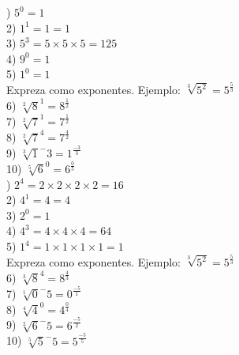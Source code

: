 \documentclass[a4paper,12pt]{article}
\begin{document}
 ) $5^0= 1$ \vspace{1cm}\\ 
2) $1^1= 1=1$ \vspace{1cm}\\ 
3) $5^3=5\times 5\times  5=125$ \vspace{1cm}\\ 
4) $9^0= 1$ \vspace{1cm}\\ 
5) $1^0= 1$ \vspace{1cm}\\ 
 Expreza como exponentes.
 Ejemplo: $\sqrt[3]{5^2}=5^\frac{5}{3} $  \vspace{0.5cm}\\ 
6) $\sqrt[2]{8}^1=8^\frac{1}{2 }$\vspace{1cm}\\ 
7) $\sqrt[2]{7}^1=7^\frac{1}{2 }$\vspace{1cm}\\ 
8) $\sqrt[2]{7}^4=7^\frac{4}{2 }$\vspace{1cm}\\ 
9) $\sqrt[3]{1}^-3=1^\frac{-3}{3 }$\vspace{1cm}\\ 
10) $\sqrt[5]{6}^0=6^\frac{0}{5 }$\vspace{1cm}\\ 

 ) $2^4=2\times 2\times 2\times  2=16$ \vspace{1cm}\\ 
2) $4^1= 4=4$ \vspace{1cm}\\ 
3) $2^0= 1$ \vspace{1cm}\\ 
4) $4^3=4\times 4\times  4=64$ \vspace{1cm}\\ 
5) $1^4=1\times 1\times 1\times  1=1$ \vspace{1cm}\\ 
 Expreza como exponentes.
 Ejemplo: $\sqrt[3]{5^2}=5^\frac{5}{3} $  \vspace{0.5cm}\\ 
6) $\sqrt[3]{8}^4=8^\frac{4}{3 }$\vspace{1cm}\\ 
7) $\sqrt[1]{0}^-5=0^\frac{-5}{1 }$\vspace{1cm}\\ 
8) $\sqrt[4]{4}^0=4^\frac{0}{4 }$\vspace{1cm}\\ 
9) $\sqrt[2]{6}^-5=6^\frac{-5}{2 }$\vspace{1cm}\\ 
10) $\sqrt[5]{5}^-5=5^\frac{-5}{5 }$\vspace{1cm}\\ 
\end{document}
